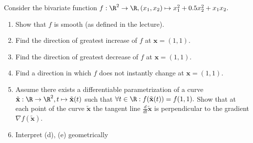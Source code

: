 Consider the bivariate function $f: \R^2 \to \R, (x_1, x_2) \mapsto x_1^2 + 0.5x_2^2 + x_1x_2.$

%
\begin{enumerate}
	\item Show that $f$ is smooth (as defined in the lecture).
	\item Find the direction of greatest increase of $f$ at $\mathbf{x} = (1,1).$
	\item Find the direction of greatest decrease of $f$ at $\mathbf{x} = (1,1).$	
	\item Find a direction in which $f$ does not instantly change at $\mathbf{x} = (1,1).$
	\item Assume there exists a differentiable parametrization of a curve $\tilde{\mathbf{x}}: \R \to \R^2, t \mapsto \tilde{\mathbf{x}}(t)$ such that $\forall t \in \R: f(\tilde{\mathbf{x}}(t)) = f(1,1).$ Show that at each point of the curve $\tilde{\mathbf{x}}$ the tangent line $\frac{d}{dt}\tilde{\mathbf{x}}$ is perpendicular to the gradient $\nabla f(\tilde{\mathbf{x}})$.
	\item Interpret (d), (e) geometrically
	  
\end{enumerate}
